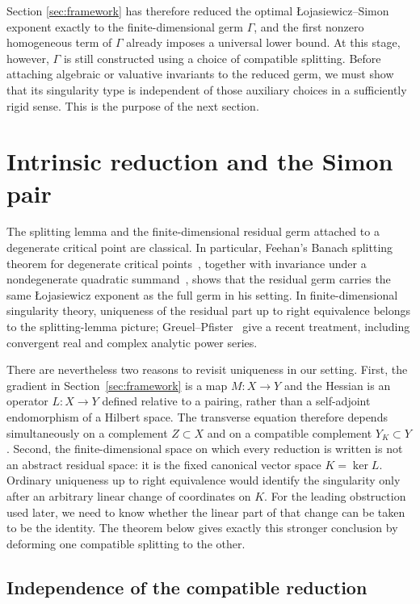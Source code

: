 \documentclass[11pt]{article}
\theoremstyle{definition}
\theoremstyle{remark}
\begin{document}
Section \ref{sec:framework} has therefore reduced the optimal Łojasiewicz--Simon exponent exactly to the finite-dimensional germ $\Gamma$, and the first nonzero homogeneous term of $\Gamma$ already imposes a universal lower bound. At this stage, however, $\Gamma$ is still constructed using a choice of compatible splitting. Before attaching algebraic or valuative invariants to the reduced germ, we must show that its singularity type is independent of those auxiliary choices in a sufficiently rigid sense. This is the purpose of the next section.


\section{Intrinsic reduction and the Simon pair}\label{sec:intrinsic}

The splitting lemma and the finite-dimensional residual germ attached to a degenerate critical point are classical. In particular, Feehan's Banach splitting theorem for degenerate critical points~\cite[Theorem~5]{Feehan2020}, together with invariance under a nondegenerate quadratic summand~\cite[Lemma~3.3]{Feehan2020}, shows that the residual germ carries the same \L{}ojasiewicz exponent as the full germ in his setting. In finite-dimensional singularity theory, uniqueness of the residual part up to right equivalence belongs to the splitting-lemma picture; Greuel--Pfister~\cite{GreuelPfister2026} give a recent treatment, including convergent real and complex analytic power series.

There are nevertheless two reasons to revisit uniqueness in our setting. First, the gradient in Section~\ref{sec:framework} is a map $M:X\to Y$ and the Hessian is an operator $L:X\to Y$ defined relative to a pairing, rather than a self-adjoint endomorphism of a Hilbert space. The transverse equation therefore depends simultaneously on a complement $Z\subset X$ and on a compatible complement $Y_K\subset Y$. Second, the finite-dimensional space on which every reduction is written is not an abstract residual space: it is the fixed canonical vector space $K=\ker L$. Ordinary uniqueness up to right equivalence would identify the singularity only after an arbitrary linear change of coordinates on $K$. For the leading obstruction used later, we need to know whether the linear part of that change can be taken to be the identity. The theorem below gives exactly this stronger conclusion by deforming one compatible splitting to the other.

\subsection{Independence of the compatible reduction}
\end{document}
